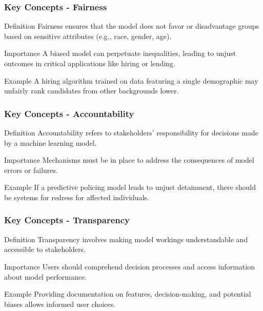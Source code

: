 \documentclass[aspectratio=169]{beamer}
\begin{document}
\begin{frame}
    \frametitle{Key Concepts - Fairness}
    \begin{block}{Definition}
        Fairness ensures that the model does not favor or disadvantage groups based on sensitive attributes (e.g., race, gender, age).
    \end{block}
    \begin{block}{Importance}
        A biased model can perpetuate inequalities, leading to unjust outcomes in critical applications like hiring or lending.
    \end{block}
    \begin{exampleblock}{Example}
        A hiring algorithm trained on data featuring a single demographic may unfairly rank candidates from other backgrounds lower.
    \end{exampleblock}
\end{frame}

\begin{frame}
    \frametitle{Key Concepts - Accountability}
    \begin{block}{Definition}
        Accountability refers to stakeholders' responsibility for decisions made by a machine learning model.
    \end{block}
    \begin{block}{Importance}
        Mechanisms must be in place to address the consequences of model errors or failures.
    \end{block}
    \begin{exampleblock}{Example}
        If a predictive policing model leads to unjust detainment, there should be systems for redress for affected individuals.
    \end{exampleblock}
\end{frame}

\begin{frame}
    \frametitle{Key Concepts - Transparency}
    \begin{block}{Definition}
        Transparency involves making model workings understandable and accessible to stakeholders.
    \end{block}
    \begin{block}{Importance}
        Users should comprehend decision processes and access information about model performance.
    \end{block}
    \begin{exampleblock}{Example}
        Providing documentation on features, decision-making, and potential biases allows informed user choices.
    \end{exampleblock}
\end{frame}
\end{document}
